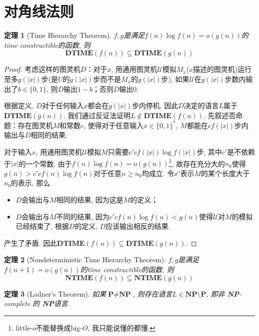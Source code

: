 \documentclass[8pt]{article}
\theoremstyle{compact}
\newtheorem{theorem}{定理}
\def\ge{\geqslant}
\def\DTIME{\textbf{DTIME}}
\def\NTIME{\textbf{NTIME}}
\def\P{\textbf{P}}
\def\NP{\textbf{NP}}
\begin{document}
\newpage
\section{对角线法则}
\begin{theorem}[Time Hierarchy Theorem]
	$f, g$是满足$f(n) \log f(n) = o(g(n))$的time constructible的函数, 则
	$$\DTIME(f(n)) \subsetneq \DTIME(g(n))$$
	\label{time_hierarchy_thm}
\end{theorem}
\begin{proof}
	考虑这样的图灵机$D$：对于$x$, 用通用图灵机$\mathcal{U}$模拟$M_x$($x$描述的图灵机)运行至多$g(|x|)$步(是$U$的$g(|x|)$步而不是$M_x$的$g(|x|)$步), 如果$\mathcal{U}$在$g(|x|)$步数内输出了$b \in \{0, 1\}$, 则$D$输出$1-b$；否则$D$输出$0$. 

	根据定义, $D$对于任何输入$x$都会在$g(|x|)$步内停机, 因此$D$决定的语言$L$属于$\DTIME(g(n))$. 我们通过反证法证明$L \notin \DTIME(f(n))$. 先叙述否命题：存在图灵机$M$和常数$c$, 使得对于任意输入$x \in \{0, 1\}^*$, $M$都能在$cf(|x|)$步内输出与$D$相同的结果. 

	对于输入$x$, 用通用图灵机$\mathcal{U}$模拟$M$只需要$c'cf(|x|)\log f(|x|)$步, 其中$c'$是不依赖于$|x|$的一个常数. 由于$f(n) \log f(n) = o(g(n))$\footnote{little-$o$不能替换成big-$O$, 我只能说懂的都懂. }, 故存在充分大的$n_0$使得$g(n) > c'cf(n) \log f(n)$对于任意$n \ge n_0$均成立. 令$x'$表示$M$的某个长度大于$n_0$的表示, 那么
	\begin{itemize}
		\item $D$会输出与$M$相同的结果, 因为这是$M$的定义；
		\item $D$会输出与$M$不同的结果, 因为$c'cf(n)\log f(n) < g(n)$使得$\mathcal U$对$M$的模拟已经结束了, 根据$D$的定义, $D$应该输出相反的结果. 
	\end{itemize}

	产生了矛盾. 因此$\DTIME(f(n)) \subsetneq \DTIME(g(n))$. 
\end{proof}
\begin{theorem}[Nondeterministic Time Hierarchy Theorem]
	$f, g$是满足$f(n + 1) = o(g(n))$的time constructible的函数, 则
	$$\NTIME(f(n)) \subsetneq \NTIME(g(n))$$
\end{theorem}
\begin{theorem}[Ladner's Theorem]
	如果$\P \neq \NP$, 则存在语言$L \in \NP \setminus \P$, 即非 \NP-complete 的 \NP 语言. 
\end{theorem}

\newpage
\end{document}
